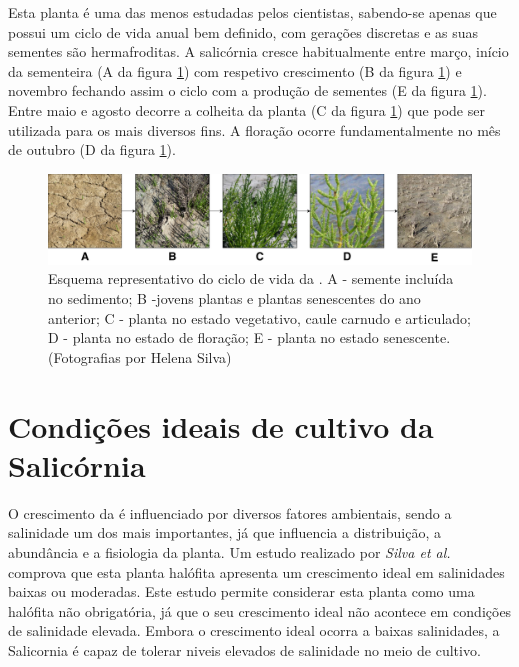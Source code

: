 Esta planta é uma das menos estudadas pelos cientistas\cite{Figueroa1987}, sabendo-se apenas que possui um ciclo de vida anual bem definido, com gerações discretas e as suas sementes são hermafroditas\cite{Silva2007}. A salicórnia cresce habitualmente entre março, início da sementeira (A da figura \ref{ciclodevida}) com respetivo crescimento (B da figura \ref{ciclodevida}) e novembro fechando assim o ciclo com a produção de sementes (E da figura \ref{ciclodevida}). Entre maio  e agosto decorre a colheita da planta\cite{RaquelPinto} (C da figura \ref{ciclodevida}) que pode ser utilizada para os mais diversos fins. A floração ocorre fundamentalmente no mês de outubro\cite{Figueroa1987} (D da figura \ref{ciclodevida}). 



	
\begin{figure}[!htb]
	\centering
	\includegraphics[width=\linewidth]{img/cap2-sali/ciclo/ciclodevida.pdf}
	\caption{Esquema representativo do ciclo de vida da \sr. A - semente incluída no sedimento; B -jovens plantas e plantas senescentes do ano anterior; C - planta no estado vegetativo, caule carnudo e articulado; D - planta no estado de floração; E - planta no estado senescente. (Fotografias por Helena Silva)}
	\label{ciclodevida}
\end{figure}



\section{Condições ideais de cultivo da Salicórnia}

O crescimento da \sr \space é influenciado por diversos fatores ambientais, sendo a salinidade um dos mais importantes, já que influencia a distribuição, a abundância e a fisiologia da planta. Um estudo realizado por \textit{Silva et al.}\cite{Silva2007} comprova que esta planta halófita apresenta um crescimento ideal em salinidades baixas ou moderadas. Este estudo permite considerar esta planta como uma halófita não obrigatória, já que o seu crescimento ideal não acontece em condições de salinidade elevada. Embora o crescimento ideal ocorra a baixas salinidades, a Salicornia é capaz de tolerar niveis elevados de salinidade no meio de cultivo\cite{Rubio-Casal2003}.

